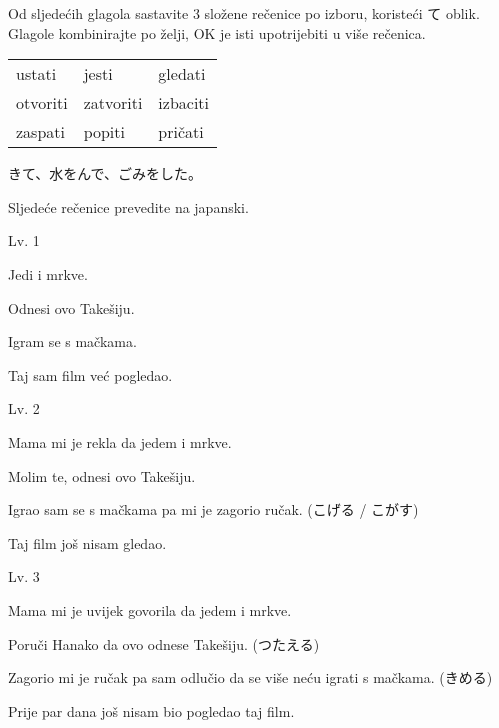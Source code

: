 
\author{Tomislav Mamić}

	
	\noindent Od sljedećih glagola sastavite 3 složene rečenice po izboru, koristeći て oblik. Glagole kombinirajte po želji, OK je isti upotrijebiti u više rečenica.
	
	\vspace{5pt}
	\begin{tabular}{l l l}
		ustati & jesti & gledati \\
		otvoriti & zatvoriti & izbaciti \\
		zaspati & popiti & pričati \\
	\end{tabular}

	 きて、水をんで、ごみをした。

	\vspace{15pt}
	\noindent Sljedeće rečenice prevedite na japanski.

	\begin{mondai}{Lv. 1}
		\item Jedi i mrkve.
		\item Odnesi ovo Takešiju.
		\item Igram se s mačkama.
		\item Taj sam film već pogledao.
	\end{mondai}

	\begin{mondai}{Lv. 2}
		\item Mama mi je rekla da jedem i mrkve.
		\item Molim te, odnesi ovo Takešiju.
		\item Igrao sam se s mačkama pa mi je zagorio ručak. (こげる / こがす)
		\item Taj film još nisam gledao.
	\end{mondai}

	\begin{mondai}{Lv. 3}
		\item Mama mi je uvijek govorila da jedem i mrkve.
		\item Poruči Hanako da ovo odnese Takešiju. (つたえる)
		\item Zagorio mi je ručak pa sam odlučio da se više neću igrati s mačkama. (きめる)
		\item Prije par dana još nisam bio pogledao taj film.
	\end{mondai}
